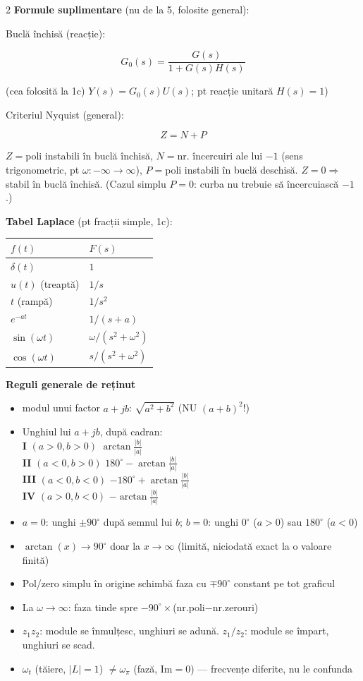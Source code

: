 \documentclass[8pt,a4paper]{extarticle}
\begin{document}
\begin{multicols}{2}
\textbf{Formule suplimentare} (nu de la 5, folosite general):

Buclă închisă (reacție):
\begin{keyeq}
$$G_0(s)=\frac{G(s)}{1+G(s)H(s)}$$
\end{keyeq}
(cea folosită la 1c) $Y(s)=G_0(s)U(s)$; pt reacție unitară $H(s)=1$)

Criteriul Nyquist (general):
\begin{keyeq}
$$Z=N+P$$
\end{keyeq}
$Z=$poli instabili în buclă închisă, $N=$nr. încercuiri ale lui $-1$ (sens trigonometric, pt $\omega:-\infty\to\infty$), $P=$poli instabili în buclă deschisă. $Z=0 \Rightarrow$ stabil în buclă închisă. (Cazul simplu $P=0$: curba nu trebuie să încercuiască $-1$.)

\textbf{Tabel Laplace} (pt fracții simple, 1c):
\begin{center}
\begin{tabular}{@{}ll@{}}
$f(t)$ & $F(s)$\\\hline
$\delta(t)$ & $1$\\
$u(t)$ (treaptă) & $1/s$\\
$t$ (rampă) & $1/s^2$\\
$e^{-at}$ & $1/(s+a)$\\
$\sin(\omega t)$ & $\omega/(s^2{+}\omega^2)$\\
$\cos(\omega t)$ & $s/(s^2{+}\omega^2)$\\
\end{tabular}
\end{center}

\textbf{Reguli generale de reținut}
\begin{itemize}
\item modul unui factor $a+jb$: $\sqrt{a^2+b^2}$ (NU $(a{+}b)^2$!)
\item Unghiul lui $a+jb$, după cadran:\\
\textbf{I} $(a{>}0,b{>}0)$ $\arctan\frac{|b|}{|a|}$\\
\textbf{II} $(a{<}0,b{>}0)$ $180^\circ-\arctan\frac{|b|}{|a|}$\\
\textbf{III} $(a{<}0,b{<}0)$ $-180^\circ+\arctan\frac{|b|}{|a|}$\\
\textbf{IV} $(a{>}0,b{<}0)$ $-\arctan\frac{|b|}{|a|}$
\item $a=0$: unghi $\pm90^\circ$ după semnul lui $b$; $b=0$: unghi $0^\circ$ ($a{>}0$) sau $180^\circ$ ($a{<}0$)
\item $\arctan(x)\to90^\circ$ doar la $x\to\infty$ (limită, niciodată exact la o valoare finită)
\item Pol/zero simplu în origine schimbă faza cu $\mp90^\circ$ constant pe tot graficul
\item La $\omega\to\infty$: faza tinde spre $-90^\circ\times$(nr.poli$-$nr.zerouri)
\item $z_1z_2$: module se înmulțesc, unghiuri se adună. $z_1/z_2$: module se împart, unghiuri se scad.
\item $\omega_t$ (tăiere, $|L|{=}1$) $\ne \omega_\pi$ (fază, Im$=0$) --- frecvențe diferite, nu le confunda
\end{itemize}

\end{multicols}
\end{document}
